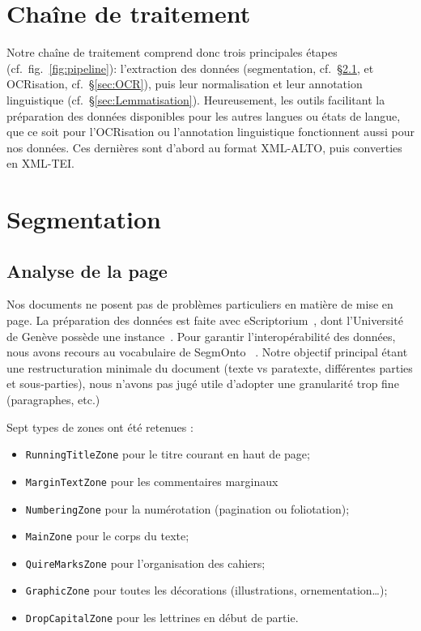 \documentclass[11pt,french]{article}
\begin{document}
\section{Chaîne de traitement}

Notre chaîne de traitement comprend donc trois principales étapes (cf.~fig.~\ref{fig:pipeline}): l'extraction des données (segmentation, cf.~\S\ref{sec:Segmentation}, et OCRisation, cf.~\S\ref{sec:OCR}), puis leur normalisation et leur annotation linguistique (cf.~\S\ref{sec:Lemmatisation}). Heureusement, les outils facilitant la préparation des données disponibles pour les autres langues ou états de langue, que ce soit pour l'OCRisation \citep{kiessling_escriptorium_2019} ou l'annotation linguistique \citep{deucalion2018} fonctionnent aussi pour nos données. Ces dernières sont d'abord au format XML-ALTO, puis converties en XML-TEI.

\section{Segmentation}

\subsection{Analyse de la page}
\label{sec:Segmentation}
Nos documents ne posent pas de problèmes particuliers en matière de mise en page. La préparation des données est faite avec eScriptorium~\cite{kiessling_escriptorium_2019}, dont l'Université de Genève possède une instance~\cite{gabay2021}. Pour garantir l'interopérabilité des données, nous avons recours au vocabulaire de SegmOnto ~\cite{gabay2023b}. Notre objectif principal étant une restructuration minimale du document (texte vs paratexte, différentes parties et sous-parties), nous n'avons pas jugé utile d'adopter une granularité trop fine (paragraphes, etc.)

Sept types de zones ont été retenues : 
\begin{itemize}
    \item \texttt{RunningTitleZone} pour le titre courant en haut de page;
    \item \texttt{MarginTextZone} pour les commentaires marginaux
    \item \texttt{NumberingZone} pour la numérotation (pagination ou foliotation);
    \item \texttt{MainZone} pour le corps du texte;
    \item \texttt{QuireMarksZone} pour l'organisation des cahiers;
    \item \texttt{GraphicZone} pour toutes les décorations (illustrations, ornementation…);
    \item \texttt{DropCapitalZone} pour les lettrines en début de partie.
\end{itemize}
\end{document}
